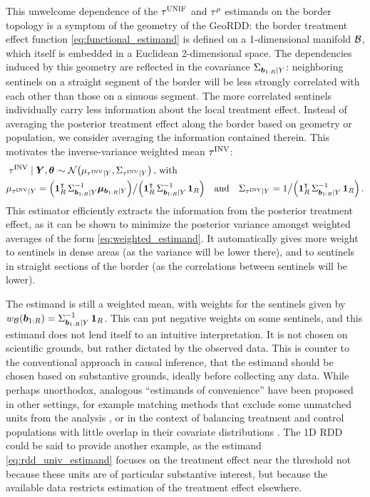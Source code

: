 This unwelcome dependence of the \(\tau^{\mathrm{UNIF}}\) and \(\tau^{\rho}\) estimands on the border topology is a symptom of the geometry of the GeoRDD: the border treatment effect function \autoref{eq:functional_estimand} is defined on a 1-dimensional manifold \(\mathcal{B}\), which itself is embedded in a Euclidean 2-dimensional space.
The dependencies induced by this geometry are reflected in the covariance \(\Sigma_{\bm{b}_{1:R} \mid Y}\): neighboring sentinels on a straight segment of the border will be less strongly correlated with each other than those on a sinuous segment.
The more correlated sentinels individually carry less information about the local treatment effect.
Instead of averaging the posterior treatment effect along the border based on geometry or population, we consider averaging the information contained therein.
This motivates the inverse-variance weighted mean \(\tau^{\mathrm{INV}}\):
\begin{equation}
    \begin{split}
        & \left. \invvar \mid \Yvec, \hyperparam \right. \sim \normal\del{\mu_{\invvar \mid Y}, \Sigma_{\invvar \mid Y}} \,\text{, with} \\
        & \mu_{\invvar \mid Y} = \del{\ones_{\numsent}\trans \Sigma_{\sentinels \mid Y}^{-1} \muvec_{\sentinels \mid Y}} \big/ \del{\ones_{\numsent}\trans \Sigma_{\sentinels \mid Y}^{-1} \ones_{\numsent}} \quad\text{and}\quad
        \Sigma_{\invvar \mid Y} = 1 \big/ \del{\ones_{\numsent}\trans \Sigma_{\sentinels \mid Y}^{-1} \ones_{\numsent}} \,.
    \end{split}
    \label{eq:invvar}
\end{equation}
This estimator efficiently extracts the information from the posterior treatment effect, as it can be shown to minimize the posterior variance amongst weighted averages of the form \autoref{eq:weighted_estimand}.
It automatically gives more weight to sentinels in dense areas (as the variance will be lower there), and to sentinels in straight sections of the border (as the correlations between sentinels will be lower).

The estimand is still a weighted mean, with weights for the sentinels given by \(w_{\mathcal{B}}(\bm{b}_{1:R}) = \Sigma_{\bm{b}_{1:R} \mid Y}^{-1} \operatorname{\mathbf{1}}_{R}\).
This can put negative weights on some sentinels, and this estimand does not lend itself to an intuitive interpretation.
It is not chosen on scientific grounds, but rather dictated by the observed data.
This is counter to the conventional approach in causal inference, that the estimand should be chosen based on substantive grounds, ideally before collecting any data.
While perhaps unorthodox, analogous ``estimands of convenience'' have been proposed in other settings, for example matching methods that exclude some unmatched units from the analysis \citep[discussed in][]{crump2009dealing}, or in the context of balancing treatment and control populations with little overlap in their covariate distributions \citep{li2016balancing}.
The 1D RDD could be said to provide another example, as the estimand \autoref{eq:rdd_univ_estimand} focuses on the treatment effect near the threshold not because these units are of particular substantive interest, but because the available data restricts estimation of the treatment effect elsewhere.

